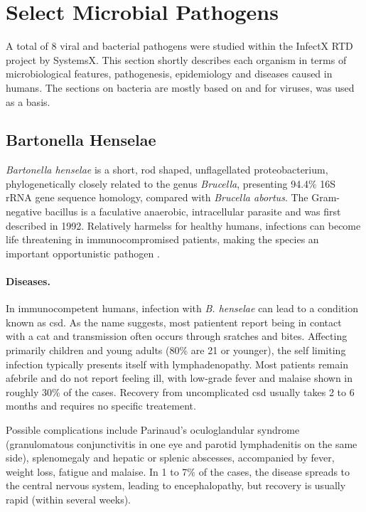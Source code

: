\section{Select Microbial Pathogens}

A total of 8 viral and bacterial pathogens were studied within the InfectX RTD project by SystemsX. This section shortly describes each organism in terms of microbiological features, pathogenesis, epidemiology and diseases caused in humans. The sections on bacteria are mostly based on \cite{Rolain2006} and for viruses, \cite{Craighead2000} was used as a basis.

\subsection{Bartonella Henselae}

\textit{Bartonella henselae} is a short, rod shaped, unflagellated proteobacterium, phylogenetically closely related to the genus \textit{Brucella}, presenting 94.4\% 16S rRNA gene sequence homology, compared with \textit{Brucella abortus}. The Gram-negative bacillus is a faculative anaerobic, intracellular parasite and was first described in 1992. Relatively harmelss for healthy humans, infections can become life threatening in immunocompromised patients, making the species an important opportunistic pathogen \citep{Anderson1997}.


\paragraph{Diseases.}
In immunocompetent humans, infection with \textit{B. henselae} can lead to a condition known as \gls{csd}. As the name suggests, most patientent report being in contact with a cat and transmission often occurs through sratches and bites. Affecting primarily children and young adults (80\% are 21 or younger), the self limiting infection typically presents itself with lymphadenopathy. Most patients remain afebrile and do not report feeling ill, with low-grade fever and malaise shown in roughly 30\% of the cases. Recovery from uncomplicated \gls{csd} usually takes 2 to 6 months and requires no specific treatement.

Possible complications include Parinaud's oculoglandular syndrome (granulomatous conjunctivitis in one eye and parotid lymphadenitis on the same side), splenomegaly and hepatic or splenic abscesses, accompanied by fever, weight loss, fatigue and malaise. In 1 to 7\% of the cases, the disease spreads to the central nervous system, leading to encephalopathy, but recovery is usually rapid (within several weeks).

